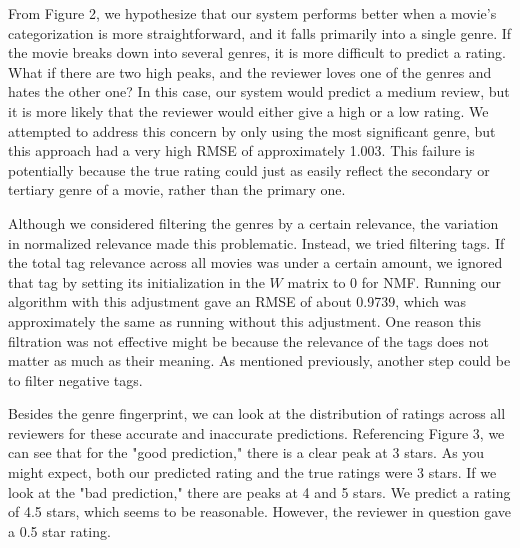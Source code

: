 \documentclass[letterpaper, 10 pt, conference]{ieeeconf}  %
\begin{document}
From Figure 2, we hypothesize that our system performs better when a movie's categorization is more straightforward, and it falls primarily into a single genre. If the movie breaks down into several genres, it is more difficult to predict a rating. What if there are two high peaks, and the reviewer loves one of the genres and hates the other one? In this case, our system would predict a medium review, but it is more likely that the reviewer would either give a high or a low rating. We attempted to address this concern by only using the most significant genre, but this approach had a very high RMSE of approximately 1.003. This failure is potentially because the true rating could just as easily reflect the secondary or tertiary genre of a movie, rather than the primary one.

Although we considered filtering the genres by a certain relevance, the variation in normalized relevance made this problematic. Instead, we tried filtering tags. If the total tag relevance across all movies was under a certain amount, we ignored that tag by setting its initialization in the $W$ matrix to 0 for NMF. Running our algorithm with this adjustment gave an RMSE of about 0.9739, which was approximately the same as running without this adjustment. One reason this filtration was not effective might be because the relevance of the tags does not matter as much as their meaning. As mentioned previously, another step could be to filter negative tags.

Besides the genre fingerprint, we can look at the distribution of ratings across all reviewers for these accurate and inaccurate predictions. Referencing Figure 3, we can see that for the "good prediction," there is a clear peak at 3 stars. As you might expect, both our predicted rating and the true ratings were 3 stars. If we look at the "bad prediction," there are peaks at 4 and 5 stars. We predict a rating of 4.5 stars, which seems to be reasonable. However, the reviewer in question gave a 0.5 star rating.
\end{document}
